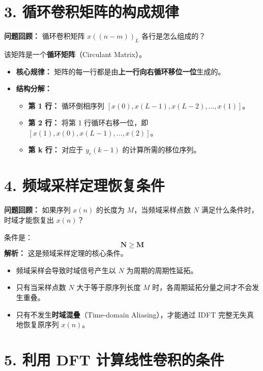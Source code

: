 \documentclass[12pt, a4paper]{article}
\begin{document}
	\section*{3. 循环卷积矩阵的构成规律}

	\textbf{问题回顾：} 循环卷积矩阵 $x((n-m))_L$ 各行是怎么组成的？

	\begin{tcolorbox}[title=回答要点, breakable]
		该矩阵是一个\textbf{循环矩阵}（Circulant Matrix）。
		\begin{itemize}
			\item \textbf{核心规律：} 矩阵的每一行都是由\textbf{上一行向右循环移位一位}生成的。
			\item \textbf{结构分解：}
			\begin{itemize}
				\item \textbf{第 1 行：} 循环倒相序列 $[x(0), x(L-1), x(L-2), \dots, x(1)]$。
				\item \textbf{第 2 行：} 将第 1 行循环右移一位，即 $[x(1), x(0), x(L-1), \dots, x(2)]$。
				\item \textbf{第 k 行：} 对应于 $y_c(k-1)$ 的计算所需的移位序列。
			\end{itemize}
		\end{itemize}
	\end{tcolorbox}

	\section*{4. 频域采样定理恢复条件}

	\textbf{问题回顾：} 如果序列 $x(n)$ 的长度为 $M$，当频域采样点数 $N$ 满足什么条件时，时域才能恢复出 $x(n)$？

	\begin{tcolorbox}[title=回答要点, breakable]
		条件是：
		\[ \mathbf{N \ge M} \]
		\textbf{解析：}
		这是频域采样定理的核心条件。
		\begin{itemize}
			\item 频域采样会导致时域信号产生以 $N$ 为周期的周期性延拓。
			\item 只有当采样点数 $N$ 大于等于原序列长度 $M$ 时，各周期延拓分量之间才不会发生重叠。
			\item 只有不发生\textbf{时域混叠}（Time-domain Aliasing），才能通过 IDFT 完整无失真地恢复原序列 $x(n)$。
		\end{itemize}
	\end{tcolorbox}

	\section*{5. 利用 DFT 计算线性卷积的条件}
\end{document}
